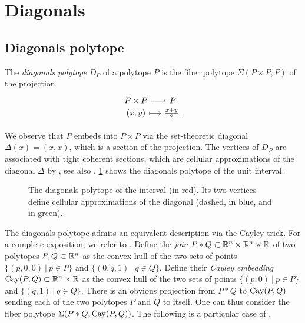 
\section{Diagonals} \label{s:diagonals}


\subsection{Diagonals polytope}

\begin{definition}
	The \emph{diagonals polytope} $D_P$ of a polytope $P$ is the fiber polytope $\Sigma(P\times P, P)$ of the projection
	\[
	\begin{tikzcd}[row sep=-2,column sep=small]
		P \times P \arrow[r] & P \\
		(x,y) \arrow[r,mapsto] &\textstyle\frac{x+y}{2}.
	\end{tikzcd}
	\]
\end{definition}

We observe that $P$ embeds into $P\times P$ via the set-theoretic diagonal $\Delta (x)=(x,x)$, which is a section of the projection.
The vertices of $D_P$ are associated with tight coherent sections, which are cellular approximations of the diagonal $\Delta$ by \cite[Proposition 5]{MTTV19}, see also \cite[Proposition 1.1]{GLA21}.
\cref{f:diagonal-interval} shows the diagonals polytope of the unit interval. 

\begin{figure}[h!]
	\centering
	
	\caption{The diagonals polytope of the interval (in red). Its two vertices define cellular approximations of the diagonal (dashed, in blue, and in green).}
	\label{f:diagonal-interval}
\end{figure}

The diagonals polytope admits an equivalent description via the Cayley trick.
For a complete exposition, we refer to \cite[Section 9.2]{deloeraTriangulations2010}.
Define the \emph{join} $P * Q \subset \mathbb{R}^n \times \mathbb{R}^n \times \mathbb{R}$ of two polytopes $P,Q \subset \mathbb{R}^n$ as the convex hull of the two sets of points $\{(p,0,0) \ | \ p \in P \}$ and $\{(0,q,1) \ | \ q \in Q\}$. 
Define their \emph{Cayley embedding} $\operatorname{Cay}(P,Q) \subset \mathbb{R}^n \times \mathbb{R}$ as the convex hull of the two sets of points $\{(p,0) \ | \ p \in P \}$ and $\{(q,1) \ | \ q \in Q\}$. 
There is an obvious projection from $P * Q$ to $\operatorname{Cay}(P,Q)$ sending each of the two polytopes $P$ and $Q$ to itself. 
One can thus consider the fiber polytope $\Sigma(P*Q,\operatorname{Cay}(P,Q))$.
The following is a particular case of \cite[Theorem 3.1]{huberCayleyTrickLifting2000}.

